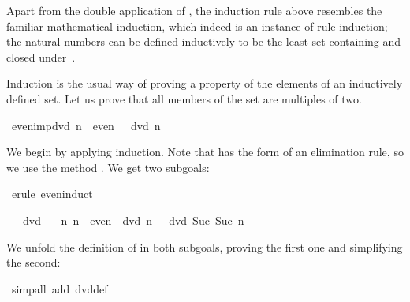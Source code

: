 \begin{isabellebody}
\begin{isamarkuptext}
Apart from the double application of , the induction rule above
resembles the familiar mathematical induction, which indeed is an instance
of rule induction; the natural numbers can be defined inductively to be
the least set containing  and closed under~.

Induction is the usual way of proving a property of the elements of an
inductively defined set.  Let us prove that all members of the set
 are multiples of two.%
\end{isamarkuptext}%
\isamarkuptrue%
\isamarkupfalse%
\ even{}imp{}dvd{}\ {}n\ {}\ even\ {}\ {}\ dvd\ n{}%
\isadelimproof
%
\endisadelimproof
%
\isatagproof
%
\begin{isamarkuptxt}%
We begin by applying induction.  Note that  has the form
of an elimination rule, so we use the method .  We get two
subgoals:%
\end{isamarkuptxt}%
\isamarkuptrue%
\isamarkupfalse%
\ {}erule\ even{}induct{}%
\begin{isamarkuptxt}%
\begin{isabelle}%
\ {}{}\ {}\ dvd\ {}\isanewline
\ {}{}\ {}n{}\ {}n\ {}\ even{}\ {}\ dvd\ n{}\ {}\ {}\ dvd\ Suc\ {}Suc\ n{}%
\end{isabelle}
We unfold the definition of  in both subgoals, proving the first
one and simplifying the second:%
\end{isamarkuptxt}%
\isamarkuptrue%
\isamarkupfalse%
\ {}simp{}all\ add{}\ dvd{}def{}%

\end{isabellebody}
